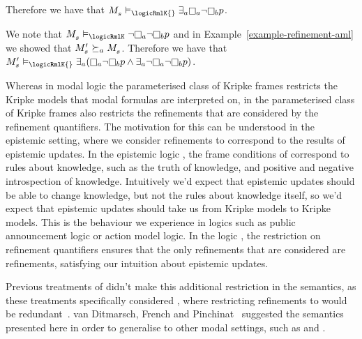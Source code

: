 \begin{example}
Therefore we have that $\kPModel{\kStateS} \entails_\logicRmlK{} \somerefsA \knowsA \lnot \knowsB \atomP$.

We note that $\kPModel{\kStateS} \entails_\logicRmlK \lnot \knowsA \lnot \knowsB \atomP$ and in Example~\ref{example-refinement-aml} we showed that $\kPModelP{\kStateS} \simulatesA \kPModel{\kStateS}$.
Therefore we have that $\kPModelP{\kStateS} \entails_\logicRmlK{} \somerefsA (\knowsA \lnot \knowsB \atomP \land \somerefsA \lnot \knowsA \lnot \knowsB \atomP)$.
\end{example}

\pagebreak

Whereas in modal logic the parameterised class of Kripke frames restricts the Kripke models that modal formulas are interpreted on, in \logicRml{} the parameterised class of Kripke frames also restricts the refinements that are considered by the refinement quantifiers.
The motivation for this can be understood in the epistemic setting, where we consider refinements to correspond to the results of epistemic updates.
In the epistemic logic \logicS{}, the frame conditions of \classS{} correspond to rules about knowledge, such as the truth of knowledge, and positive and negative introspection of knowledge.
Intuitively we'd expect that epistemic updates should be able to change knowledge, but not the rules about knowledge itself, so we'd expect that epistemic updates should take us from \classS{} Kripke models to \classS{} Kripke models.
This is the behaviour we experience in logics such as public announcement logic or action model logic.
In the logic \logicRmlS{}, the restriction on refinement quantifiers ensures that the only refinements that are considered are \classS{} refinements, satisfying our intuition about epistemic updates.

Previous treatments of \logicRml{} didn't make this additional restriction in the semantics, as these treatments specifically considered \logicRmlK{}, where restricting refinements to \classK{} would be redundant~\cite{vanditmarsch:2009,vanditmarsch:2010}.
van Ditmarsch, French and Pinchinat~\cite{vanditmarsch:2010} suggested the semantics presented here in order to generalise \logicRml{} to other modal settings, such as \classS{} and \classKF{}.   

